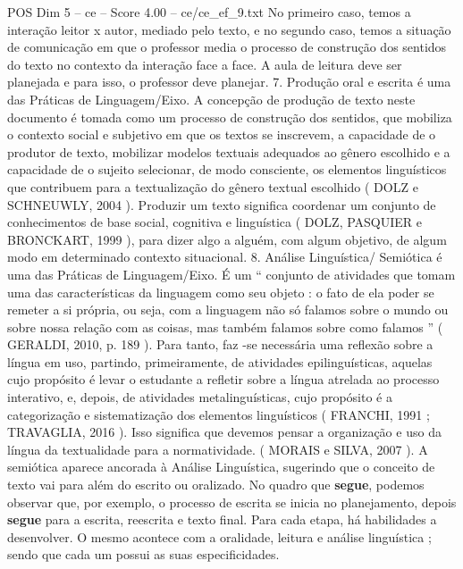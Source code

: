 \begin{textsample}{POS Dim 5 – ce – Score 4.00 – ce/ce\_ef\_9.txt}
No primeiro caso, temos a interação leitor x autor, mediado pelo texto, e no segundo caso, temos a situação de comunicação em que o professor media o processo de construção dos sentidos do texto no contexto da interação face a face.
A aula de leitura deve ser planejada e para isso, o professor deve planejar. 7.
Produção oral e escrita é uma das Práticas de Linguagem/Eixo.
A concepção de produção de texto neste documento é tomada como um processo de construção dos sentidos, que mobiliza o contexto social e subjetivo em que os textos se inscrevem, a capacidade de o produtor de texto, mobilizar modelos textuais adequados ao gênero escolhido e a capacidade de o sujeito selecionar, de modo consciente, os elementos linguísticos que contribuem para a textualização do gênero textual escolhido ( DOLZ e SCHNEUWLY, 2004 ).
Produzir um texto significa coordenar um conjunto de conhecimentos de base social, cognitiva e linguística ( DOLZ, PASQUIER e BRONCKART, 1999 ), para dizer algo a alguém, com algum objetivo, de algum modo em determinado contexto situacional. 8.
Análise Linguística/ Semiótica é uma das Práticas de Linguagem/Eixo.
É um “ conjunto de atividades que tomam uma das características da linguagem como seu objeto : o fato de ela poder se remeter a si própria, ou seja, com a linguagem não só falamos sobre o mundo ou sobre nossa relação com as coisas, mas também falamos sobre como falamos ” ( GERALDI, 2010, p. 189 ).
Para tanto, faz -se necessária uma reflexão sobre a língua em uso, partindo, primeiramente, de atividades epilinguísticas, aquelas cujo propósito é levar o estudante a refletir sobre a língua atrelada ao processo interativo, e, depois, de atividades metalinguísticas, cujo propósito é a categorização e sistematização dos elementos linguísticos ( FRANCHI, 1991 ; TRAVAGLIA, 2016 ).
Isso significa que devemos pensar a organização e uso da língua da textualidade para a normatividade. ( MORAIS e SILVA, 2007 ).
A semiótica aparece ancorada à Análise Linguística, sugerindo que o conceito de texto vai para além do escrito ou oralizado.
No quadro que \textbf{segue}, podemos observar que, por exemplo, o processo de escrita se inicia no planejamento, depois \textbf{segue} para a escrita, reescrita e texto final.
Para cada etapa, há habilidades a desenvolver.
O mesmo acontece com a oralidade, leitura e análise linguística ; sendo que cada um possui as suas especificidades.

\end{textsample}

